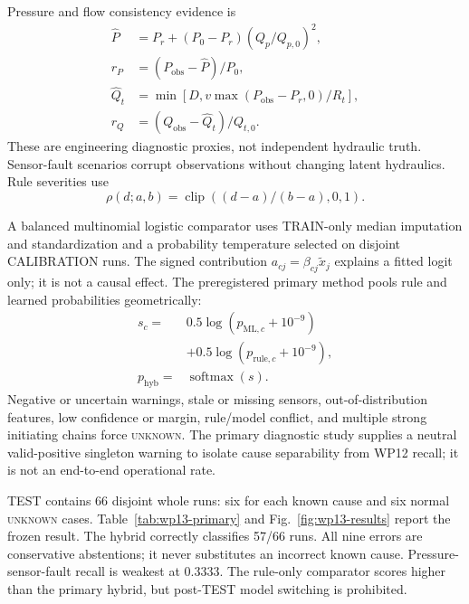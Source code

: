 \documentclass[10pt,twocolumn]{article}
\begin{document}
Pressure and flow consistency evidence is
\begin{equation}
\begin{aligned}
 \widehat P&=P_r+(P_0-P_r)(Q_p/Q_{p,0})^2,\\
 r_P&=(P_{\mathrm{obs}}-\widehat P)/P_0,\\
 \widehat Q_t&=\min[D,v\max(P_{\mathrm{obs}}-P_r,0)/R_t],\\
 r_Q&=(Q_{\mathrm{obs}}-\widehat Q_t)/Q_{t,0}.
\end{aligned}
\label{eq:attribution-residuals}
\end{equation}
These are engineering diagnostic proxies, not independent hydraulic truth.
Sensor-fault scenarios corrupt observations without changing latent hydraulics.
Rule severities use
\begin{equation}
 \rho(d;a,b)=\operatorname{clip}\left((d-a)/(b-a),0,1\right).
 \label{eq:attribution-ramp}
\end{equation}

A balanced multinomial logistic comparator uses TRAIN-only median imputation
and standardization and a probability temperature selected on disjoint
CALIBRATION runs. The signed contribution
$a_{cj}=\beta_{cj}\widetilde x_j$ explains a fitted logit only; it is not a
causal effect. The preregistered primary method pools rule and learned
probabilities geometrically:
\begin{equation}
\begin{aligned}
 s_c={}&0.5\log(p_{\mathrm{ML},c}+10^{-9})\\
      &+0.5\log(p_{\mathrm{rule},c}+10^{-9}),\\
 p_{\mathrm{hyb}}={}&\operatorname{softmax}(s).
\end{aligned}
\label{eq:attribution-fusion}
\end{equation}
Negative or uncertain warnings, stale or missing sensors, out-of-distribution
features, low confidence or margin, rule/model conflict, and multiple strong
initiating chains force \textsc{unknown}. The primary diagnostic study supplies
a neutral valid-positive singleton warning to isolate cause separability from
WP12 recall; it is not an end-to-end operational rate.

TEST contains 66 disjoint whole runs: six for each known cause and six normal
\textsc{unknown} cases. Table~\ref{tab:wp13-primary} and
Fig.~\ref{fig:wp13-results} report the frozen result. The hybrid correctly
classifies 57/66 runs. All nine errors are conservative abstentions; it never
substitutes an incorrect known cause. Pressure-sensor-fault recall is weakest
at 0.3333. The rule-only comparator scores higher than the primary hybrid, but
post-TEST model switching is prohibited.
\end{document}
